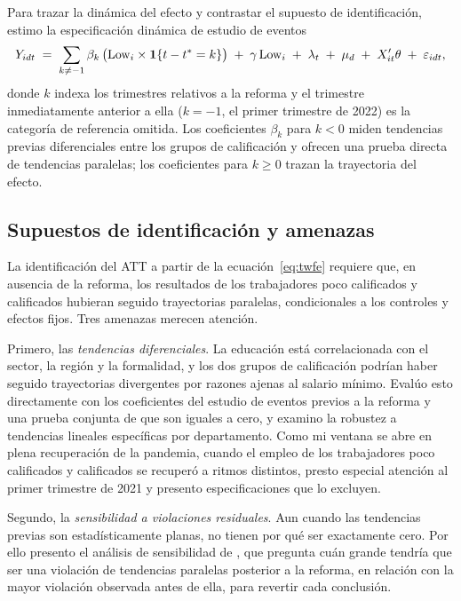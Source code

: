 Para trazar la dinámica del efecto y contrastar el supuesto de identificación, estimo la especificación dinámica de estudio de eventos
\begin{equation}
Y_{idt} \;=\; \sum_{k\neq -1}\beta_k\,\bigl(\mathrm{Low}_i\times\mathbf{1}\{t-t^{\ast}=k\}\bigr)
\;+\; \gamma\,\mathrm{Low}_i \;+\; \lambda_t \;+\; \mu_d \;+\; X_{it}'\theta \;+\; \varepsilon_{idt},
\label{eq:event}
\end{equation}
donde $k$ indexa los trimestres relativos a la reforma y el trimestre inmediatamente anterior a ella ($k=-1$, el primer trimestre de 2022) es la categoría de referencia omitida. Los coeficientes $\beta_k$ para $k<0$ miden tendencias previas diferenciales entre los grupos de calificación y ofrecen una prueba directa de tendencias paralelas; los coeficientes para $k\ge 0$ trazan la trayectoria del efecto.

\subsection{Supuestos de identificación y amenazas}

La identificación del ATT a partir de la ecuación~\eqref{eq:twfe} requiere que, en ausencia de la reforma, los resultados de los trabajadores poco calificados y calificados hubieran seguido trayectorias paralelas, condicionales a los controles y efectos fijos. Tres amenazas merecen atención.

Primero, las \emph{tendencias diferenciales}. La educación está correlacionada con el sector, la región y la formalidad, y los dos grupos de calificación podrían haber seguido trayectorias divergentes por razones ajenas al salario mínimo. Evalúo esto directamente con los coeficientes del estudio de eventos previos a la reforma y una prueba conjunta de que son iguales a cero, y examino la robustez a tendencias lineales específicas por departamento. Como mi ventana se abre en plena recuperación de la pandemia, cuando el empleo de los trabajadores poco calificados y calificados se recuperó a ritmos distintos, presto especial atención al primer trimestre de 2021 y presento especificaciones que lo excluyen.

Segundo, la \emph{sensibilidad a violaciones residuales}. Aun cuando las tendencias previas son estadísticamente planas, no tienen por qué ser exactamente cero. Por ello presento el análisis de sensibilidad de \citet{rambachan_roth_2023}, que pregunta cuán grande tendría que ser una violación de tendencias paralelas posterior a la reforma, en relación con la mayor violación observada antes de ella, para revertir cada conclusión.


